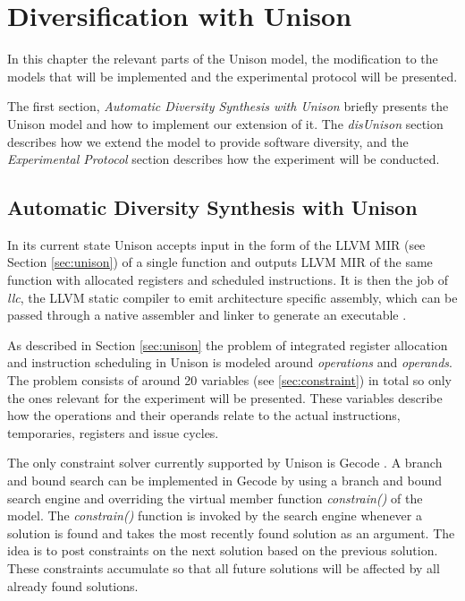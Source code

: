 \chapter{Diversification with Unison}

In this chapter the relevant parts of the Unison model, the modification to the models that
will be implemented and the experimental protocol will be presented.

The first section, \textit{Automatic Diversity Synthesis with Unison} briefly presents the
Unison model and how to implement our extension of it. The \textit{disUnison} section
describes how we extend the model to provide software diversity, and the
\textit{Experimental Protocol} section describes how the experiment will be conducted.

\section{Automatic Diversity Synthesis with Unison}
\label{sec:unison-model}

In its current state Unison accepts input in the form of the LLVM MIR (see Section
\ref{sec:unison}) of a single function \cite{unison-docs} and outputs LLVM MIR of the same
function with allocated registers and scheduled instructions. It is then the job of
\textit{llc}, the LLVM static compiler to emit architecture specific assembly, which can
be passed through a native assembler and linker to generate an executable \cite{llvm-llc}.

As described in Section \ref{sec:unison} the problem of integrated register allocation and
instruction scheduling in Unison is modeled around \textit{operations} and \textit{operands}.
The problem consists of around 20 variables (see \ref{sec:constraint}) in total so only the
ones relevant for the experiment will be presented. These variables describe how the
operations and their operands relate to the actual instructions, temporaries, registers
and issue cycles.

The only constraint solver currently supported by Unison is Gecode \cite{unison-docs}. A
branch and bound search can be implemented in Gecode by using a branch and bound search
engine and overriding the virtual member function \textit{constrain()} of the model. The
\textit{constrain()} function is invoked by the search engine whenever a solution is found
and takes the most recently found solution as an argument. The idea is to post constraints
on the next solution based on the previous solution. These constraints accumulate so
that all future solutions will be affected by all already found solutions.

